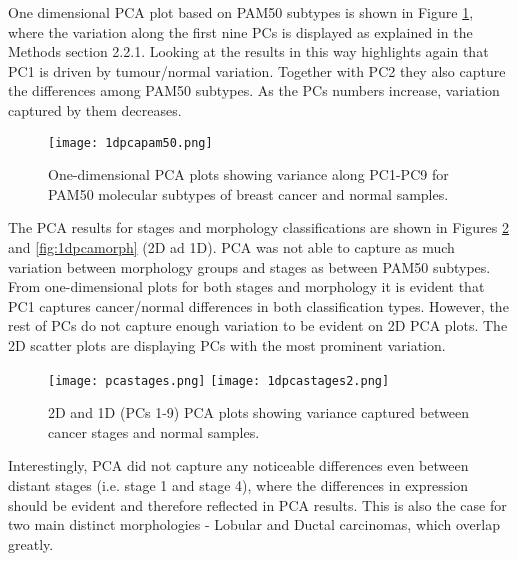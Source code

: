     \newpage
    One dimensional PCA plot based on PAM50 subtypes is shown in Figure \ref{fig:1dpcapam50}, where the variation along the first nine PCs is displayed as explained in the Methods section 2.2.1. Looking at the results in this way highlights again that PC1 is driven by tumour/normal variation. Together with PC2 they also capture the differences among PAM50 subtypes. As the PCs numbers increase, variation captured by them decreases. 
    
            \begin{figure}[!h]
            \centering
            \texttt{[image: 1dpcapam50.png]}
            \caption{One-dimensional PCA plots showing variance along PC1-PC9 for PAM50 molecular subtypes of breast cancer and normal samples. }
            \label{fig:1dpcapam50}
            \end{figure}
    
    
    The PCA results for stages and morphology classifications are shown in Figures \ref{fig:1dpcastage} and \ref{fig:1dpcamorph} (2D ad 1D). PCA was not able to capture as much variation between morphology groups and stages as between PAM50 subtypes. From one-dimensional plots for both stages and morphology it is evident that PC1 captures cancer/normal differences in both classification types. However, the rest of PCs do not capture enough variation to be evident on 2D PCA plots. The 2D scatter plots are displaying PCs with the most prominent variation.     
    
            
            \begin{figure}[!h]
            \hspace*{\fill}
            \texttt{[image: pcastages.png]}\hfill
            \texttt{[image: 1dpcastages2.png]}
            \hspace*{\fill}
            \caption{2D and 1D (PCs 1-9) PCA plots showing variance captured between cancer stages and normal samples.}
            \label{fig:1dpcastage}
            \end{figure}
            
        Interestingly, PCA did not capture any noticeable differences even between distant stages (i.e. stage 1 and stage 4), where the differences in expression should be evident and therefore reflected in PCA results. This is also the case for two main distinct morphologies - Lobular and Ductal carcinomas, which overlap greatly.
    
